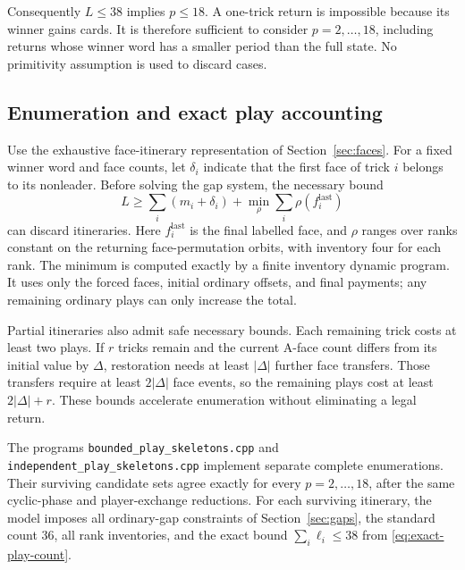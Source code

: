 \documentclass[11pt]{article}
\newcommand{\word}[1]{\texttt{#1}}
\begin{document}
Consequently $L\le38$ implies $p\le18$. A one-trick return is impossible
because its winner gains cards. It is therefore sufficient to consider
$p=2,\ldots,18$, including returns whose winner word has a smaller period
than the full state. No primitivity assumption is used to discard cases.

\subsection{Enumeration and exact play accounting}

Use the exhaustive face-itinerary representation of Section~\ref{sec:faces}.
For a fixed winner word and face counts, let $\delta_i$ indicate that the
first face of trick $i$ belongs to its nonleader. Before solving the gap
system, the necessary bound
\[
L\ge\sum_i(m_i+\delta_i)+
       \min_{\rho}\sum_i\rho(f_i^{\mathrm{last}})
\]
can discard itineraries. Here $f_i^{\mathrm{last}}$ is the final labelled
face, and $\rho$ ranges over ranks constant on the returning face-permutation
orbits, with inventory four for each rank. The minimum is computed exactly
by a finite inventory dynamic program. It uses only the forced faces,
initial ordinary offsets, and final payments; any remaining ordinary plays
can only increase the total.

Partial itineraries also admit safe necessary bounds. Each remaining trick
costs at least two plays. If $r$ tricks remain and the current A-face count
differs from its initial value by $\Delta$, restoration needs at least
$|\Delta|$ further face transfers. Those transfers require at least
$2|\Delta|$ face events, so the remaining plays cost at least
$2|\Delta|+r$. These bounds accelerate enumeration without eliminating a
legal return.

The programs \word{bounded\_play\_skeletons.cpp} and
\word{independent\_play\_skeletons.cpp} implement separate complete
enumerations. Their surviving candidate sets agree exactly for every
$p=2,\ldots,18$, after the same cyclic-phase and player-exchange reductions.
For each surviving itinerary, the model imposes all ordinary-gap constraints
of Section~\ref{sec:gaps}, the standard count 36, all rank inventories, and
the exact bound $\sum_i\ell_i\le38$ from \eqref{eq:exact-play-count}.
\end{document}
